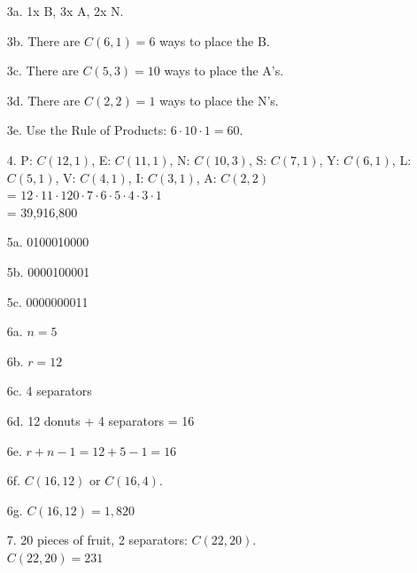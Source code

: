{\begin{itemize}
		\item[3a.]	1x B, 3x A, 2x N.
		\item[3b.]	There are $C(6,1) = 6$ ways to place the B.
		\item[3c.]	There are $C(5,3) = 10$ ways to place the A's.
		\item[3d.]	There are $C(2,2) = 1$ ways to place the N's.
		\item[3e.]	Use the Rule of Products: $6 \cdot 10 \cdot 1 = 60$.
		
		\item[4.]	P: $C(12,1)$, E: $C(11,1)$, N: $C(10,3)$, S: $C(7,1)$, Y: $C(6,1)$, L: $C(5,1)$, V: $C(4,1)$, I: $C(3,1)$, A: $C(2,2)$ \\
					= $12 \cdot 11 \cdot 120 \cdot 7 \cdot 6 \cdot 5 \cdot 4 \cdot 3 \cdot 1$ \\
					= 39,916,800

        \item[5a.]  0100010000
        \item[5b.]  0000100001
        \item[5c.]  0000000011

        \item[6a.]  $n = 5$
        \item[6b.]  $r = 12$
        \item[6c.]  4 separators
        \item[6d.]  12 donuts + 4 separators = 16
        \item[6e.]  $r + n - 1 = 12 + 5 - 1 = 16$
        \item[6f.]  $C(16,12)$ or $C(16,4)$.
        \item[6g.]  $C(16,12) = 1,820$

        \item[7.]   20 pieces of fruit, 2 separators: $C(22,20)$. \\
                    $C(22,20) = 231$
    \end{itemize}
}


